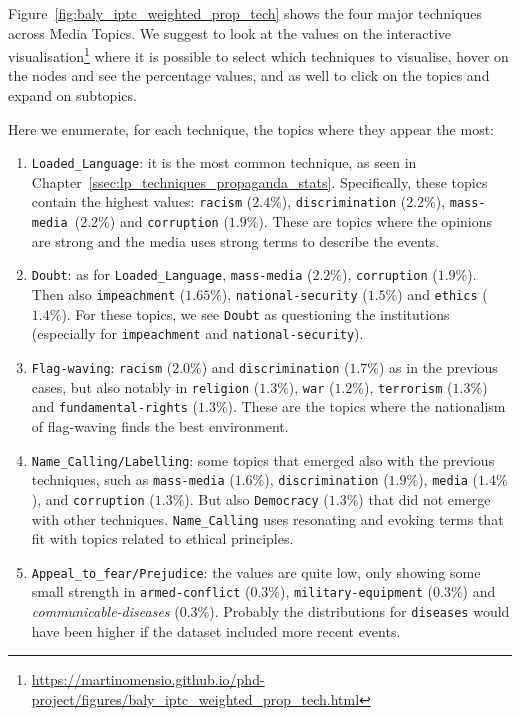 Figure~\ref{fig:baly_iptc_weighted_prop_tech} shows the four major techniques across Media Topics. We suggest to look at the values on the interactive visualisation\footnote{\url{https://martinomensio.github.io/phd-project/figures/baly_iptc_weighted_prop_tech.html}} where it is possible to select which techniques to visualise, hover on the nodes and see the percentage values, and as well to click on the topics and expand on subtopics.

Here we enumerate, for each technique, the topics where they appear the most:

\begin{enumerate}
    \item \texttt{Loaded\_Language}: it is the most common technique, as seen in Chapter~\ref{ssec:lp_techniques_propaganda_stats}. Specifically, these topics contain the highest values: \texttt{racism} ($2.4\%$), \texttt{discrimination} ($2.2\%$), \texttt{mass-media }($2.2\%$) and \texttt{corruption} ($1.9\%$). These are topics where the opinions are strong and the media uses strong terms to describe the events.
    \item \texttt{Doubt}: as for \texttt{Loaded\_Language}, \texttt{mass-media} ($2.2\%$), \texttt{corruption} ($1.9\%$). Then also \texttt{impeachment} ($1.65\%$), \texttt{national-security} ($1.5\%$) and \texttt{ethics} ($1.4\%$). For these topics, we see \texttt{Doubt} as questioning the institutions (especially for \texttt{impeachment} and \texttt{national-security}).
    \item \texttt{Flag-waving}: \texttt{racism} ($2.0\%$) and \texttt{discrimination} ($1.7\%$) as in the previous cases, but also notably in \texttt{religion} ($1.3\%$), \texttt{war} ($1.2\%$), \texttt{terrorism} ($1.3\%$) and \texttt{fundamental-rights} ($1.3\%$). These are the topics where the nationalism of flag-waving finds the best environment.
    \item \texttt{Name\_Calling/Labelling}: some topics that emerged also with the previous techniques, such as \texttt{mass-media} ($1.6\%$), \texttt{discrimination} ($1.9\%$), \texttt{media} ($1.4\%$), and \texttt{corruption} ($1.3\%$). But also \texttt{Democracy} ($1.3\%$) that did not emerge with other techniques. \texttt{Name\_Calling} uses resonating and evoking terms that fit with topics related to ethical principles.
    \item \texttt{Appeal\_to\_fear/Prejudice}: the values are quite low, only showing some small strength in \texttt{armed-conflict} ($0.3\%$), \texttt{military-equipment} ($0.3\%$) and \textit{communicable-diseases} ($0.3\%$). Probably the distributions for \texttt{diseases} would have been higher if the dataset included more recent events.

\end{enumerate}
